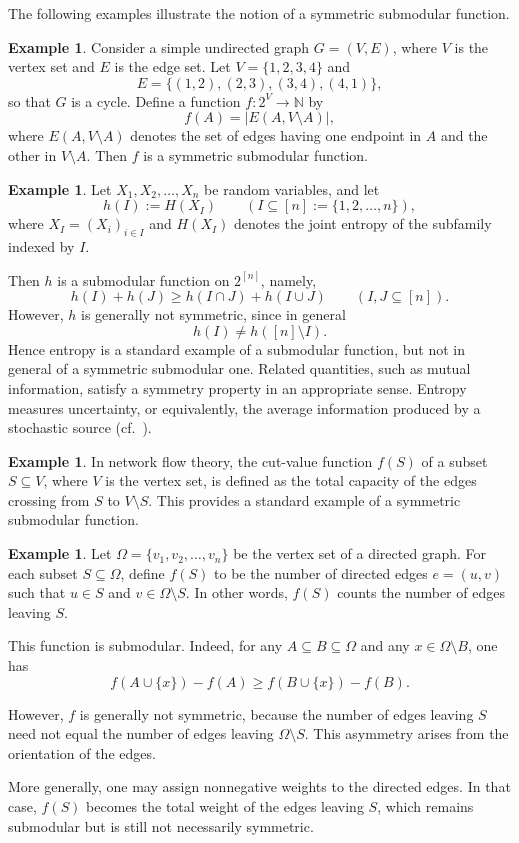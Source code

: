 \documentclass[10pt]{book}
\theoremstyle{definition}
\newtheorem{example}[theorem]{Example}
\begin{document}
The following examples illustrate the notion of a symmetric submodular function.

\begin{example}
Consider a simple undirected graph \(G=(V,E)\), where \(V\) is the vertex set and \(E\) is the edge set.  
Let \(V=\{1,2,3,4\}\) and
\[
E=\{(1,2),(2,3),(3,4),(4,1)\},
\]
so that \(G\) is a cycle.  
Define a function \(f:2^V\to\mathbb{N}\) by
\[
f(A)=|E(A,V\setminus A)|,
\]
where \(E(A,V\setminus A)\) denotes the set of edges having one endpoint in \(A\) and the other in \(V\setminus A\).  
Then \(f\) is a symmetric submodular function.
\end{example}

\begin{example}
Let \(X_1,X_2,\dots,X_n\) be random variables, and let
\[
h(I):=H(X_I)
\qquad
(I\subseteq [n]:=\{1,2,\dots,n\}),
\]
where \(X_I=(X_i)_{i\in I}\) and \(H(X_I)\) denotes the joint entropy of the subfamily indexed by \(I\).

Then \(h\) is a submodular function on \(2^{[n]}\), namely,
\[
h(I)+h(J)\ge h(I\cap J)+h(I\cup J)
\qquad
(I,J\subseteq [n]).
\]
However, \(h\) is generally not symmetric, since in general
\[
h(I)\neq h([n]\setminus I).
\]
Hence entropy is a standard example of a submodular function, but not in general of a symmetric submodular one.
Related quantities, such as mutual information, satisfy a symmetry property in an appropriate sense.
Entropy measures uncertainty, or equivalently, the average information produced by a stochastic source
(cf.~\cite{Singh2014EntropyTI,Gray1990EntropyAI}).
\end{example}

\begin{example}
In network flow theory, the cut-value function \(f(S)\) of a subset \(S\subseteq V\), where \(V\) is the vertex set, is defined as the total capacity of the edges crossing from \(S\) to \(V\setminus S\).  
This provides a standard example of a symmetric submodular function.
\end{example}

\begin{example}
Let \(\Omega=\{v_1,v_2,\dots,v_n\}\) be the vertex set of a directed graph.  
For each subset \(S\subseteq\Omega\), define \(f(S)\) to be the number of directed edges \(e=(u,v)\) such that \(u\in S\) and \(v\in \Omega\setminus S\).  
In other words, \(f(S)\) counts the number of edges leaving \(S\).

This function is submodular. Indeed, for any \(A\subseteq B\subseteq \Omega\) and any \(x\in \Omega\setminus B\), one has
\[
f(A\cup\{x\})-f(A)\geq f(B\cup\{x\})-f(B).
\]

However, \(f\) is generally not symmetric, because the number of edges leaving \(S\) need not equal the number of edges leaving \(\Omega\setminus S\).  
This asymmetry arises from the orientation of the edges.

More generally, one may assign nonnegative weights to the directed edges.  
In that case, \(f(S)\) becomes the total weight of the edges leaving \(S\), which remains submodular but is still not necessarily symmetric.
\end{example}
\end{document}
